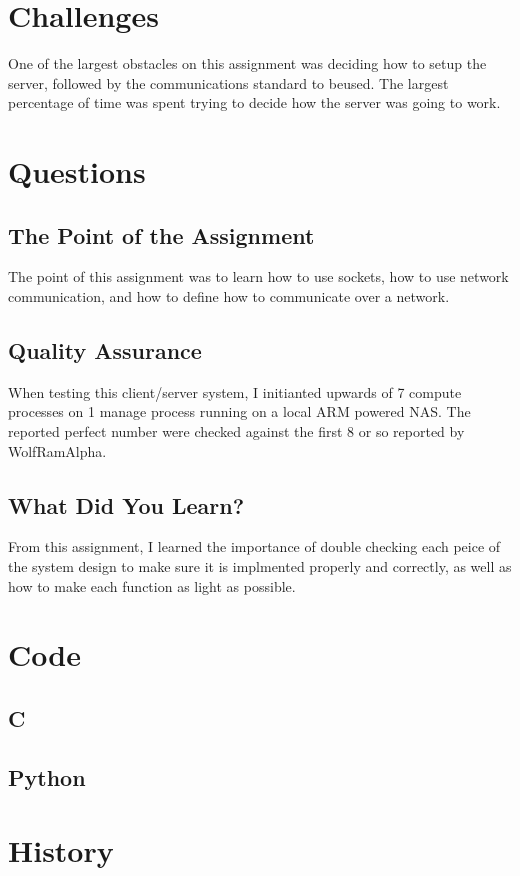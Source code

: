 \documentclass[letterpaper,10pt,titlepage]{article}
\begin{document}
\section{Challenges}
\label{Overcoming Project challenges}
One of the largest obstacles on this assignment was deciding how to setup the server, followed by the communications standard to beused. The largest percentage of time was spent trying to decide how the server was going to work.

\section{Questions}
\label{Project Quesions}
\subsection{The Point of the Assignment}
\label{Point}
The point of this assignment was to learn how to use sockets, how to use network communication, and how to define how to communicate over a network.
\subsection{Quality Assurance}
\label{QA}
When testing this client/server system, I initianted upwards of 7 compute processes on 1 manage process running on a local ARM powered NAS. The reported perfect number were checked against the first 8 or so reported by WolfRamAlpha.
\subsection{What Did You Learn?}
\label{Learned}
From this assignment, I learned the importance of double checking each peice of the system design to make sure it is implmented properly and correctly, as well as how to make each function as light as possible.


\section{Code}
\label{myar Source Code}
\subsection{C}
\label{Compute Header}

\label{Compute}

\subsection{Python}
\label{Manage Server}

\label{Report Clinet}

\section{History}
\end{document}
